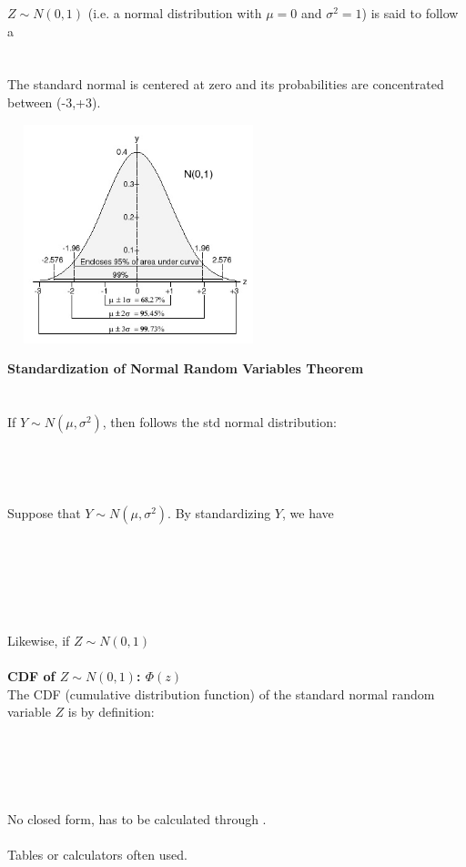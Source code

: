 \pagebreak

$Z\sim N(0,1)$ (i.e. a normal distribution with $\mu=0$ and $\sigma^2=1$) is said to follow a \\~\\~\\
The standard normal is centered at zero and its probabilities are concentrated between (-3,+3).
\begin{center}
\vspace{-10pt}
\includegraphics[height=2.5in,width=3in]{chapter4/stdnormaldistribution.jpg}
\end{center}


\textbf{Standardization of Normal Random Variables Theorem}\\~\\~\\
If $Y \sim N(\mu, \sigma^2)$, then  \underbar{~~~~~~~~~~~~~~~~~~~~~~~~~~~~~~~~~~~~~~~~~~~~~}  follows the std normal distribution:\\~\\~\\~\\~\\
Suppose that $Y \sim N(\mu, \sigma^2)$. By standardizing $Y$, we have\\~\\~\\~\\~\\~\\~\\
Likewise,  if $Z\sim N(0,1)$ \underbar{~~~~~~~~~~~~~~~~~~~~~~~~~~~~~~~~~~~~~~~~~~~~~~~~~~~~~~~} \\~\\

\textbf{CDF of $Z \sim N(0, 1)$: $\Phi(z)$}\\
The CDF (cumulative distribution function) of the standard normal random variable $Z$ is by definition:\\~\\~\\~\\~\\~\\
No closed form, has to be calculated through  \underbar{~~~~~~~~~~~~~~~~~~~~~~~~~~~~~~~~~~~~~~~~~~~~~~~~~~~~} .\\~\\
Tables or calculators often used.

